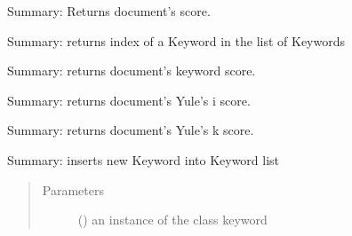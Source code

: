 \documentclass[letterpaper,10pt,english]{sphinxmanual}
\begin{document}
\begin{fulllineitems}
\begin{fulllineitems}
\label{\detokenize{KeywordList:KeywordList.KeywordList.getdocumentscore}}
Summary: Returns document’s score.

\end{fulllineitems}


\begin{fulllineitems}
\label{\detokenize{KeywordList:KeywordList.KeywordList.getindexofword}}
Summary: returns index of a Keyword in the list of Keywords

\end{fulllineitems}


\begin{fulllineitems}
\label{\detokenize{KeywordList:KeywordList.KeywordList.getkeywordscore}}
Summary: returns document’s keyword score.

\end{fulllineitems}


\begin{fulllineitems}
\label{\detokenize{KeywordList:KeywordList.KeywordList.getyulesiscore}}
Summary: returns document’s Yule’s i score.

\end{fulllineitems}


\begin{fulllineitems}
\label{\detokenize{KeywordList:KeywordList.KeywordList.getyuleskscore}}
Summary: returns document’s Yule’s k score.

\end{fulllineitems}


\begin{fulllineitems}
\label{\detokenize{KeywordList:KeywordList.KeywordList.insertkeyword}}
Summary: inserts new Keyword into Keyword list
\begin{quote}\begin{description}
\item[{Parameters}] \leavevmode
{} () \textendash{} an instance of the class keyword


\end{description}
\end{quote}
\end{fulllineitems}
\end{fulllineitems}
\end{document}
